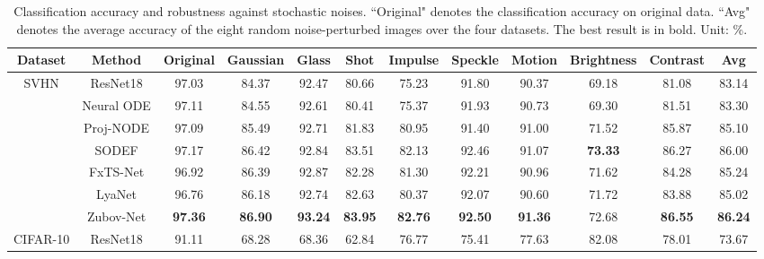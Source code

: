 \documentclass[journal]{IEEEtran}
\begin{document}
\begin{table}[ht]
	\centering
	\caption{ Classification accuracy and robustness against stochastic noises. ``Original" denotes the classification accuracy on original data. ``Avg" denotes the average accuracy of the eight random noise-perturbed images over the four datasets. The best result is in bold. Unit: \%.} 
	\label{table:acc_noise}
	\begin{tabular}{cccccccccccc}
		\toprule
		Dataset                  & Method     & Original        & Gaussian       & Glass          & Shot           & Impulse        & Speckle        & Motion         & Brightness     & Contrast       & Avg  \\ \midrule
		
		\multirow{6}{*}{SVHN} & ResNet18        & 97.03            & 84.37             & 92.47          & 80.66          & 75.23            & 91.80            & 90.37           & 69.18               & 81.08             & 83.14  \\
		& Neural ODE      & 97.11           & 84.55             & 92.61          & 80.41          & 75.37            & 91.93            & 90.73           & 69.30               & 81.51             & 83.30          \\
		& Proj-NODE	      & 97.09           & 85.49 			& 92.71 	 		& 81.83 	     & 80.95 	      & 91.40 	         & 91.00 	        & 71.52 	      & 85.87 	            & 85.10   \\
		& SODEF           & 97.17            & 86.42             & 92.84          & 83.51          & 82.13            & 92.46            & 91.07           & \textbf{73.33}      & 86.27             & 86.00          \\
		& FxTS-Net        & 96.92            & 86.39             & 92.87          & 82.28          & 81.30            & 92.21            & 90.96           & 71.62               & 84.28             & 85.24         \\
		& LyaNet          & 96.76            & 86.18             & 92.74          & 82.63          & 80.37            & 92.07            & 90.60           & 71.72               & 83.88             & 85.02          \\
		& Zubov-Net       & \textbf{97.36}   & \textbf{86.90}    & \textbf{93.24} & \textbf{83.95} & \textbf{82.76}   & \textbf{92.50}   & \textbf{91.36}  & 72.68               & \textbf{86.55}    & \textbf{86.24} \\ \midrule
		\multirow{6}{*}{CIFAR-10} & ResNet18        & 91.11            & 68.28             & 68.36          & 62.84          & 76.77            & 75.41            & 77.63           & 82.08               & 78.01             & 73.67        \\

\end{tabular}
\end{table}
\end{document}
